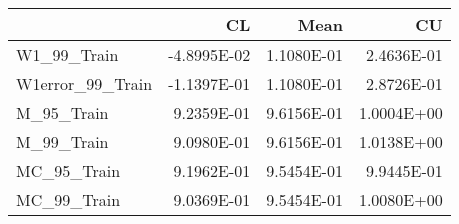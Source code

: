 \begin{tabular}{lrrr}
\toprule
{} &          CL &       Mean &         CU \\
\midrule
W1\_99\_Train      & -4.8995E-02 & 1.1080E-01 & 2.4636E-01 \\
W1error\_99\_Train & -1.1397E-01 & 1.1080E-01 & 2.8726E-01 \\
M\_95\_Train       &  9.2359E-01 & 9.6156E-01 & 1.0004E+00 \\
M\_99\_Train       &  9.0980E-01 & 9.6156E-01 & 1.0138E+00 \\
MC\_95\_Train      &  9.1962E-01 & 9.5454E-01 & 9.9445E-01 \\
MC\_99\_Train      &  9.0369E-01 & 9.5454E-01 & 1.0080E+00 \\
\bottomrule
\end{tabular}
